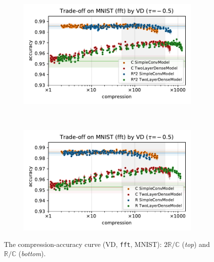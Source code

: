 \documentclass[a4paper,10pt,twocolumn]{article}
\newcommand{\real}{\mathbb{R}}
\newcommand{\cplx}{\mathbb{C}}
\begin{document}
\begin{figure}[!t]
  \centering
  \begin{subfigure}[b]{1.\columnwidth}  %
    \centering
    \includegraphics[width=\columnwidth]{figure__mnist-like__trade-off/appendix__cmp__VD__mnist__fft__-0.5.pdf}
  \end{subfigure} \\%
  \begin{subfigure}[b]{1.\columnwidth}  %
    \centering
    \includegraphics[width=\columnwidth]{figure__mnist-like__trade-off/appendix__VD__mnist__fft__-0.5.pdf}
  \end{subfigure}
  \caption{%
    The compression-accuracy curve (VD, \texttt{fft}, MNIST):
    $2 \real / \cplx$ (\textit{top}) and $\real / \cplx$ (\textit{bottom}).
  }
  \label{fig:mnist-like__trade-off__fft}
\end{figure}
\end{document}
